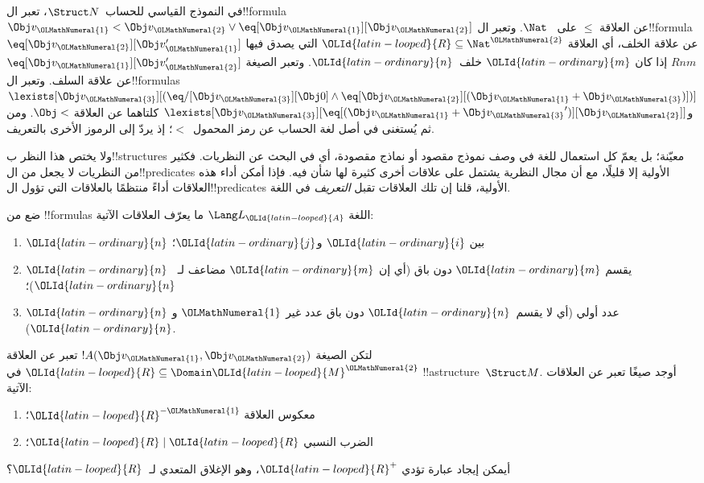 \documentclass[../../../include/open-logic-section]{subfiles}
\begin{document}
\begin{ex}
في النموذج القياسي للحساب~$\Struct N$، تعبر ال!!{formula} $\Obj
v_\OLMathNumeral{1} < \Obj v_\OLMathNumeral{2} \lor \eq[\Obj v_\OLMathNumeral{1}][\Obj v_\OLMathNumeral{2}]$ عن العلاقة $\le$ على
~$\Nat$. وتعبر ال!!{formula} $\eq[\Obj v_\OLMathNumeral{2}][\Obj v_\OLMathNumeral{1}']$ عن علاقة
الخلف، أي العلاقة $\OLId{latin-looped}{R} \subseteq \Nat^\OLMathNumeral{2}$ التي يصدق فيها $Rnm$ إذا كان
$\OLId{latin-ordinary}{m}$ خلف~$\OLId{latin-ordinary}{n}$. وتعبر الصيغة $\eq[\Obj v_\OLMathNumeral{1}][\Obj v_\OLMathNumeral{2}']$ عن علاقة السلف.
وتعبر ال!!{formula}s $\lexists[\Obj v_\OLMathNumeral{3}][(\eq/[\Obj v_\OLMathNumeral{3}][\Obj 0] \land
  \eq[\Obj v_\OLMathNumeral{2}][(\Obj v_\OLMathNumeral{1} + \Obj v_\OLMathNumeral{3})])]$ و$\lexists[\Obj
  v_\OLMathNumeral{3}][\eq[(\Obj v_\OLMathNumeral{1} + {\Obj v_\OLMathNumeral{3}}')][\Obj v_\OLMathNumeral{2}]]$ كلتاهما عن العلاقة
$\Obj <$. ومن ثم يُستغنى في أصل لغة الحساب عن رمز المحمول~$<$؛
إذ يردّ إلى الرموز الأخرى بالتعريف.
\end{ex}

\begin{explain}
ولا يختص هذا النظر ب!!{structure}s معيّنة؛ بل يعمّ كل استعمال
للغة في وصف نموذج مقصود أو نماذج مقصودة، أي في البحث عن النظريات.
فكثير من النظريات لا يجعل من ال!!{predicate}s الأولية إلا قليلًا،
مع أن مجال النظرية يشتمل على علاقات أخرى كثيرة لها شأن فيه.
فإذا أمكن أداء هذه العلاقات أداءً منتظمًا بالعلاقات التي تؤول
ال!!{predicate}s الأولية، قلنا إن تلك العلاقات تقبل
\emph{التعريف} في اللغة.
\end{explain}

\begin{prob}
ضع من !!{formula}s اللغة $\Lang L_\OLId{latin-looped}{A}$ ما يعرّف العلاقات الآتية:
\begin{enumerate}
\item $\OLId{latin-ordinary}{n}$ بين $\OLId{latin-ordinary}{i}$ و$\OLId{latin-ordinary}{j}$؛
\item $\OLId{latin-ordinary}{n}$ يقسم $\OLId{latin-ordinary}{m}$ دون باق (أي إن $\OLId{latin-ordinary}{m}$ مضاعف لـ~$\OLId{latin-ordinary}{n}$)؛
\item $\OLId{latin-ordinary}{n}$ عدد أولي (أي لا يقسم~$\OLId{latin-ordinary}{n}$ دون باق عدد غير $\OLMathNumeral{1}$ و$\OLId{latin-ordinary}{n}$).
\end{enumerate}
\end{prob}

\begin{prob}
لتكن الصيغة $!A(\Obj v_\OLMathNumeral{1}, \Obj v_\OLMathNumeral{2})$ تعبر عن العلاقة $\OLId{latin-looped}{R}
\subseteq \Domain \OLId{latin-looped}{M}^\OLMathNumeral{2}$ في !!a{structure}~$\Struct M$. أوجد صيغًا
تعبر عن العلاقات الآتية:
\begin{enumerate}
\item معكوس العلاقة $\OLId{latin-looped}{R}^{-\OLMathNumeral{1}}$؛
\item الضرب النسبي $\OLId{latin-looped}{R} \mid \OLId{latin-looped}{R}$؛
\end{enumerate}
أيمكن إيجاد عبارة تؤدي $\OLId{latin-looped}{R}^+$، وهو الإغلاق المتعدي لـ~$\OLId{latin-looped}{R}$؟
\end{prob}
\end{document}
